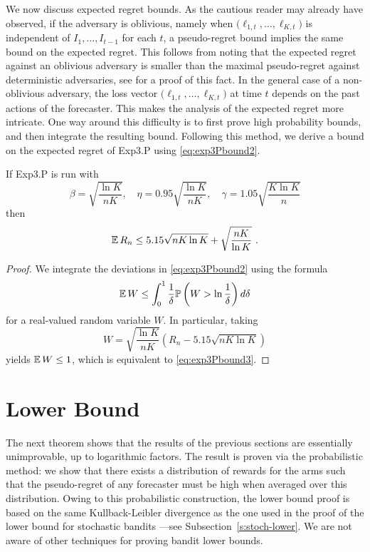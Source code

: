 %
We now discuss expected regret bounds. As the cautious reader may already have observed, if the adversary is oblivious, namely when $\bigl(\ell_{1,t}, \hdots, \ell_{K,t}\bigr)$ is independent of $I_1, \hdots, I_{t-1}$ for each $t$, a pseudo-regret bound implies the same bound on the expected regret. This follows from noting that the expected regret against an oblivious adversary is smaller than the maximal pseudo-regret against deterministic adversaries, see \cite[Proposition 33]{AB10} for a proof of this fact. In the general case of a non-oblivious adversary, the loss vector $\bigl(\ell_{1,t}, \hdots, \ell_{K,t}\bigr)$ at time $t$ depends on the past actions of the forecaster. This makes the analysis of the expected regret more intricate. One way around this difficulty is to first prove high probability bounds, and then integrate the resulting bound. Following this method, we derive a bound on the expected regret of Exp3.P using \eqref{eq:exp3Pbound2}.
%
\begin{theorem}
If Exp3.P is run with
\[
    \beta = \sqrt{\frac{\ln K }{n K}}, \quad \eta = 0.95 \sqrt{\frac{\ln K }{n K}}, \quad \gamma = 1.05 \sqrt{\frac{K \ln K }{n}}
\]
then
\begin{equation} \label{eq:exp3Pbound3}
\mathbb{E}\,R_n \leq 5.15 \sqrt{n K \ln K} + \sqrt{\frac{n K}{\ln K }}~.
\end{equation}
\end{theorem}
%
\begin{proof}
We integrate the deviations in \eqref{eq:exp3Pbound2} using the formula
\[
    \mathbb{E}\,W \leq \int_{0}^1 \frac{1}{\delta} \mathbb{P}\left(W>\ln\frac{1}{\delta}\right) d\delta
\]
for a real-valued random variable $W$. In particular, taking
\[
    W=\sqrt{\frac{\ln K }{n K}} \left(R_n - 5.15 \sqrt{n K \ln K }\right)
\]
yields $\mathbb{E}\,W \leq 1$, which is equivalent to \eqref{eq:exp3Pbound3}.
\end{proof}

\section{Lower Bound} \label{sec:LB}
The next theorem shows that the results of the previous sections are essentially unimprovable, up to logarithmic factors. The result is proven via the probabilistic method: we show that there exists a distribution of rewards for the arms such that the pseudo-regret of any forecaster must be high when averaged over this distribution. Owing to this probabilistic construction, the lower bound proof is based on the same Kullback-Leibler divergence as the one used in the proof of the lower bound for stochastic bandits ---see Subsection~\ref{s:stoch-lower}. We are not aware of other techniques for proving bandit lower bounds.


